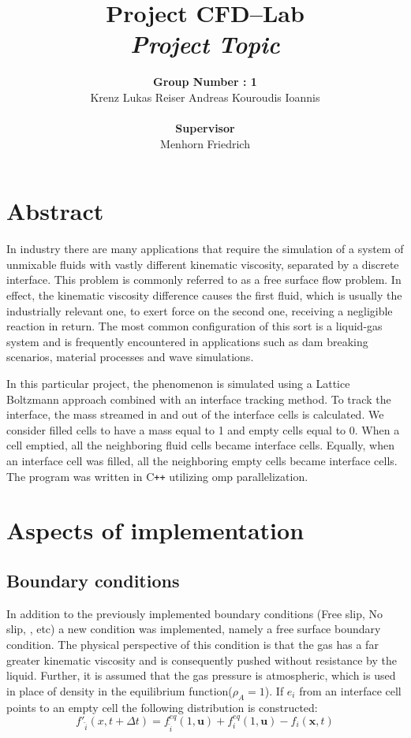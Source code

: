 \documentclass[10pt,a4paper,notitlepage]{article}
\begin{document}
\title{Project CFD--Lab\\ \textit{Project Topic}}
\author{\textbf{Group Number : 1}\\Krenz Lukas Reiser Andreas Kouroudis Ioannis \\ \\\textbf{Supervisor}\\Menhorn Friedrich }
\maketitle
\section*{Abstract}
In industry there are many applications that require the simulation of a system of unmixable fluids with vastly different kinematic viscosity, separated by a discrete interface.  This problem is commonly referred to as a free surface flow problem. In effect, the kinematic viscosity difference causes the first fluid, which is usually the industrially relevant one, to exert force on the second one, receiving a negligible reaction in return. The most common configuration of this sort is a liquid-gas system and is frequently encountered in applications such as dam breaking scenarios, material processes and wave simulations.

	In this particular project, the phenomenon is simulated  using a Lattice Boltzmann approach combined with an interface tracking method. To track the interface, the mass streamed in and out of the interface cells is calculated. We consider filled cells to have a mass equal to 1 and empty cells equal to 0. When a cell emptied, all the neighboring fluid cells became interface cells. Equally, when an interface cell was filled, all the neighboring empty cells became interface cells.
	The program was written in C\texttt{++} utilizing omp parallelization.
\\
\section{Aspects of implementation}
\subsection{Boundary conditions}
In addition to the previously implemented boundary conditions (Free slip, No slip, , etc) a new condition was implemented, namely a free surface boundary condition.
The physical perspective of this condition is that the gas has a far greater kinematic viscosity and is consequently pushed without resistance by the liquid. Further, it is assumed that the gas pressure is atmospheric, which is used in place of density in the equilibrium function($\rho_{A} = 1$).
If $e_{i}$ from an interface cell points to an empty cell the following distribution is constructed:
\begin{equation} \label{eq:dist}
f'_{\hat{i}} (x, t + \Delta t) = f^{eq}_{\hat{i}}(1, \mathbf{u})+f^{eq}_{{i}}(1, \mathbf{u})-f_{i}(\mathbf{x},t)
\end{equation}
\end{document}
